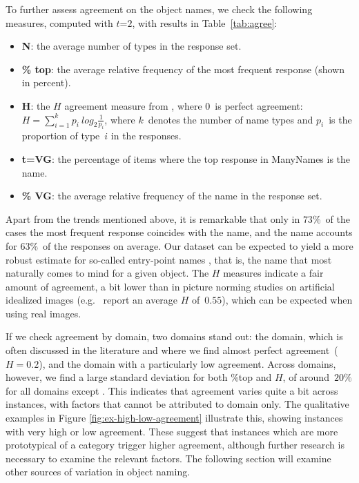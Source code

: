 To further assess agreement on the object names, we check the following measures, computed with \mbox{$t$=$2$}, with results in Table~\ref{tab:agree}:
\begin{itemize}
  \setlength\itemsep{-0.5pt}
\item \textbf{N}: the average number of types in the response set. %
\item \textbf{\% top}: the average relative frequency of the most frequent response (shown in percent).
\item $\mathbf{H}$: the $H$ agreement measure from \cite{snodgrass}, where $0$~is perfect agreement: \mbox{$H = \sum_{i=1}^k p_i~log_2\frac{1}{p_i}$}, 
where $k$~denotes the number of name types and $p_i$~is the proportion of type~$i$ in the responses. 
\item \textbf{t=VG}: the percentage of items where the top response in ManyNames is the \vg name.
\item \textbf{\% VG}: the average relative frequency of the \vg name in the response set.
\end{itemize}

Apart from the trends mentioned above, it is remarkable that only in $73$\%~of the cases the most frequent response coincides with the \vg name, and the \vg name accounts for $63$\%~of the responses on average.
Our dataset can be expected to yield a more robust estimate for so-called entry-point names \cite{jolicoeur1984pictures}, that is, the name that most naturally comes to mind for a given object.
The $H$ measures indicate a fair amount of agreement, a bit lower than in picture norming studies on artificial idealized images (e.g.\  report an average $H$ of~$0.55$), which can be expected when using real images.

If we check agreement by domain, two domains stand out: the  domain, which is often discussed in the literature and where we find almost perfect agreement\ (\mbox{$H=0.2$}), and the  domain with a particularly low agreement.
Across domains, however, we find a large standard deviation for both \%top and $H$, of around\ $20\%$ for all domains except .
This indicates that agreement varies quite a bit across instances, with factors that cannot be attributed to domain only.
The qualitative examples in Figure \ref{fig:ex-high-low-agreement} illustrate this, showing instances with very high or low agreement.
These suggest that instances which are more prototypical of a category trigger higher agreement, although further research is necessary to examine the relevant factors.
The following section will examine other sources of variation in object naming.

